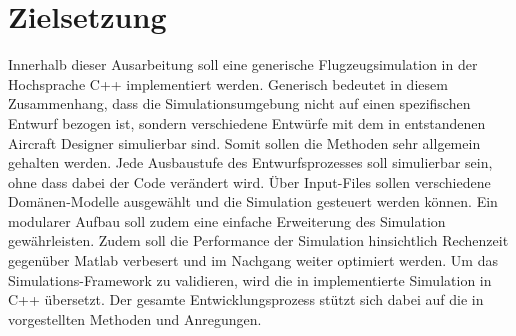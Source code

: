 \section{Zielsetzung}
Innerhalb dieser Ausarbeitung soll eine generische Flugzeugsimulation in der Hochsprache C++ implementiert werden. Generisch bedeutet in diesem Zusammenhang, dass die Simulationsumgebung nicht auf einen spezifischen Entwurf bezogen ist, sondern verschiedene Entwürfe mit dem in \cite{Olucak.15.02.2017} entstandenen Aircraft Designer simulierbar sind. Somit sollen die Methoden sehr allgemein gehalten werden.  Jede Ausbaustufe des Entwurfsprozesses soll simulierbar sein, ohne dass dabei der Code verändert wird. Über Input-Files sollen verschiedene Domänen-Modelle ausgewählt und die Simulation gesteuert werden können.  Ein modularer Aufbau soll zudem eine einfache Erweiterung des Simulation gewährleisten. Zudem soll die Performance der Simulation hinsichtlich Rechenzeit gegenüber Matlab verbesert und im Nachgang weiter optimiert werden. Um das Simulations-Framework zu validieren, wird die in \cite{Olucak.15.02.2017} implementierte Simulation in C++ übersetzt. Der gesamte Entwicklungsprozess stützt sich dabei auf die in \cite{Kessler.Sommersemester2017} vorgestellten Methoden und Anregungen.
 
